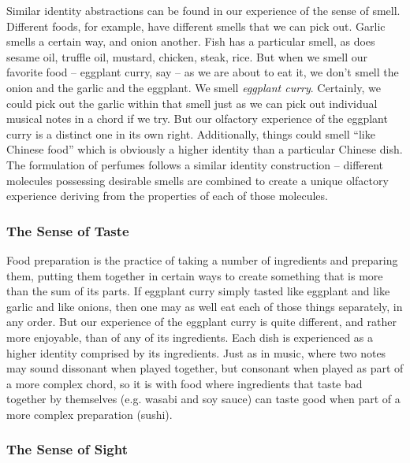 \documentclass[pra,twocolumn,groupedaddress,10pt]{revtex4}
\theoremstyle{definition}
\begin{document}
Similar identity abstractions can be found in our experience of the sense of smell. Different foods, for example, have different smells that we can pick out. Garlic smells a certain way, and onion another. Fish has a particular smell, as does sesame oil, truffle oil, mustard, chicken, steak, rice. But when we smell our favorite food -- eggplant curry, say -- as we are about to eat it, we don't smell the onion and the garlic and the eggplant. We smell \textit{eggplant curry}. Certainly, we could pick out the garlic within that smell just as we can pick out individual musical notes in a chord if we try. But our olfactory experience of the eggplant curry is a distinct one in its own right. Additionally, things could smell ``like Chinese food'' which is obviously a higher identity than a particular Chinese dish. The formulation of perfumes follows a similar identity construction -- different molecules possessing desirable smells are combined to create a unique olfactory experience deriving from the properties of each of those molecules\cite{smellmolecules}.

\subsubsection{The Sense of Taste} \label{sec:sentas}

Food preparation is the practice of taking a number of ingredients and preparing them, putting them together in certain ways to create something that is more than the sum of its parts. If eggplant curry simply tasted like eggplant and like garlic and like onions, then one may as well eat each of those things separately, in any order. But our experience of the eggplant curry is quite different, and rather more enjoyable, than of any of its ingredients. Each dish is experienced as a higher identity comprised by its ingredients. Just as in music, where two notes may sound dissonant when played together, but consonant when played as part of a more complex chord, so it is with food where ingredients that taste bad together by themselves (e.g. wasabi and soy sauce) can taste good when part of a more complex preparation (sushi).

\subsubsection{The Sense of Sight} \label{sec:sensig}
\end{document}
